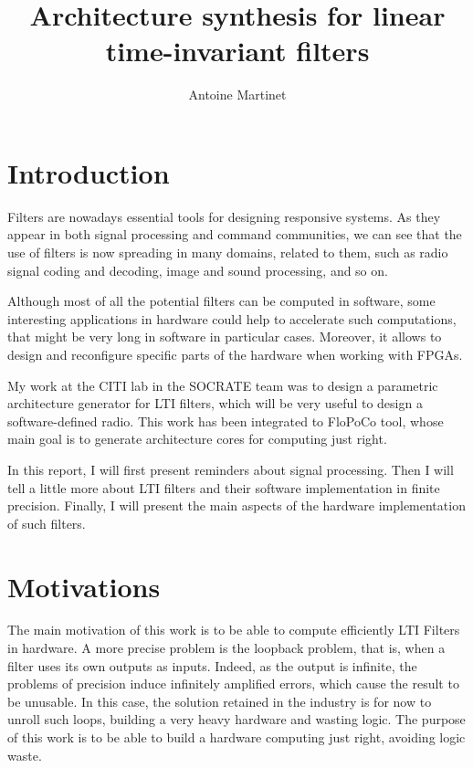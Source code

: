 \documentclass[twoside]{article}
\title{Architecture synthesis for linear time-invariant filters}
\author{Antoine Martinet}
\theoremstyle{remark}
\numberwithin{equation}{subsection}
\begin{document}
\maketitle
\newpage
\tableofcontents
\newpage

\section*{ Introduction }

	Filters are nowadays essential tools for designing responsive systems.
	As they appear in both signal processing and command communities,
	we can see that the use of filters is now spreading in many domains, related to them,
	such as radio signal coding and decoding, image and sound processing, and so on.


	Although most of all the potential filters can be computed in software,
	some interesting applications in hardware could help to accelerate such computations, 
	that might be very long in software in particular cases.
	Moreover, it allows to design and reconfigure specific parts of the hardware when working with FPGAs.

	
	My work at the CITI lab in the SOCRATE team was to design a parametric architecture generator for LTI filters, 
	which will be very useful to design a software-defined radio.
	This work has been integrated to FloPoCo tool,
	whose main goal is to generate architecture cores for computing just right.


	In this report, I will first present reminders about signal processing.
	Then I will tell a little more about LTI filters and their software implementation in finite precision.
	Finally, I will present the main aspects of the hardware implementation of such filters.

\section{Motivations}
	The main motivation of this work is to be able to compute efficiently LTI Filters in hardware.
	A more precise problem is the loopback problem, that is, when a filter uses its own outputs as inputs.
	Indeed, as the output is infinite, the problems of precision induce infinitely amplified errors,
	which cause the result to be unusable.
	In this case, the solution retained in the industry is for now to unroll such loops,
	building a very heavy hardware and wasting logic.
	The purpose of this work is to be able to build a hardware computing just right,
	avoiding logic waste.
\end{document}
